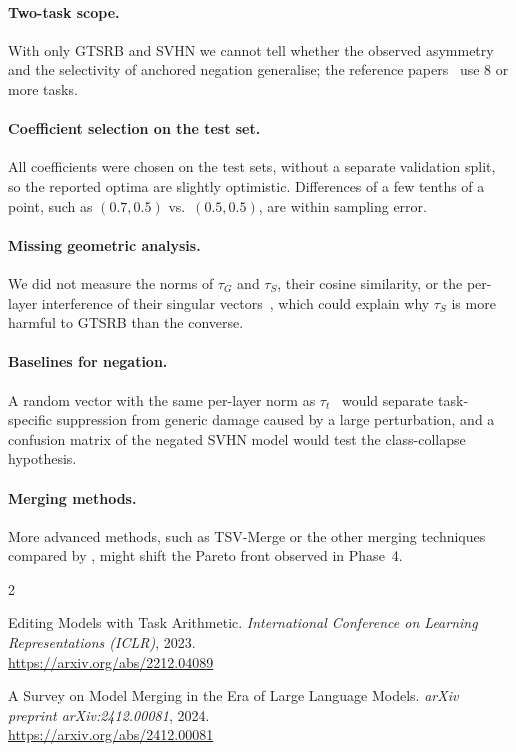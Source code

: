 \documentclass[11pt,a4paper,twocolumn]{article}
\newcommand{\tG}{\tau_G}
\newcommand{\tS}{\tau_S}
\begin{document}
\paragraph{Two-task scope.} With only GTSRB and SVHN we cannot tell
whether the observed asymmetry and the selectivity of anchored negation
generalise; the reference papers~\citep{ilharco2023,gargiulo2025} use
8 or more tasks.

\paragraph{Coefficient selection on the test set.} All coefficients were
chosen on the test sets, without a separate validation split, so the
reported optima are slightly optimistic. Differences of a few tenths of a
point, such as $(0.7,0.5)$ vs.\ $(0.5,0.5)$, are within sampling error.

\paragraph{Missing geometric analysis.} We did not measure the norms of
$\tG$ and $\tS$, their cosine similarity, or the per-layer interference
of their singular vectors~\citep{gargiulo2025}, which could explain why
$\tS$ is more harmful to GTSRB than the converse.

\paragraph{Baselines for negation.} A random vector with the same
per-layer norm as $\tau_t$~\citep{ilharco2023} would separate task-specific
suppression from generic damage caused by a large perturbation, and a
confusion matrix of the negated SVHN model would test the class-collapse
hypothesis.

\paragraph{Merging methods.} More advanced methods, such as TSV-Merge or
the other merging techniques compared by \citet{gargiulo2025}, might shift
the Pareto front observed in Phase~4.

\small\raggedright
\setlength{\bibsep}{2pt}
\begin{thebibliography}{2}

Editing Models with Task Arithmetic.
\newblock \emph{International Conference on Learning Representations (ICLR)}, 2023.\\
\url{https://arxiv.org/abs/2212.04089}

A Survey on Model Merging in the Era of Large Language Models.
\newblock \emph{arXiv preprint arXiv:2412.00081}, 2024.\\
\url{https://arxiv.org/abs/2412.00081}

\end{thebibliography}
\end{document}
